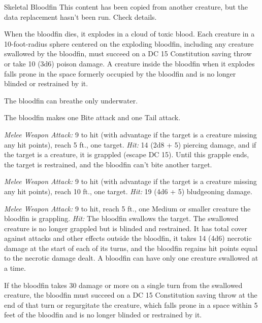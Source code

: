 \documentclass[10pt,a4paper,twoside,bg=print,twocolumn,openany,nodeprecatedcode]{dndbook}
\begin{document}
\begin{DndMonster}[float=t]{Skeletal Bloodfin}
\DndMonsterBasics[
armor-class = {16 (natural armor)},
hit-points = {\DndDice{11d10 + 33}},
speed = {5 ft., swim 50 ft.}
]
\DndMonsterAbilityScores[
 str = 20,
 dex = 14,
 con = 16,
 int = 2,
 wis = 10,
 cha = 3
]
\DndMonsterDetails[
skills = {Perception +4},
damage-immunities = {poison},
condition-immunities = {poisoned},
senses = {blindsight 100 ft. (blind beyond this radius), passive perception 14},
challenge = 9,
]
This content has been copied from another creature, but the data replacement hasn't been run. Check details.

When the bloodfin dies, it explodes in a cloud of toxic blood. Each creature in a 10-foot-radius sphere centered on the exploding bloodfin, including any creature swallowed by the bloodfin, must succeed on a DC 15 Constitution saving throw or take 10 (3d6) poison damage. A creature inside the bloodfin when it explodes falls prone in the space formerly occupied by the bloodfin and is no longer blinded or restrained by it.

The bloodfin can breathe only underwater.

The bloodfin makes one Bite attack and one Tail attack.

\textsl{Melee Weapon Attack:} 9 to hit (with advantage if the target is a creature missing any hit points), reach 5 ft., one target. \textsl{Hit:} 14 (2d8 + 5) piercing damage, and if the target is a creature, it is grappled (escape DC 15). Until this grapple ends, the target is restrained, and the bloodfin can't bite another target.

\textsl{Melee Weapon Attack:} 9 to hit (with advantage if the target is a creature missing any hit points), reach 10 ft., one target. \textsl{Hit:} 19 (4d6 + 5) bludgeoning damage.

\textsl{Melee Weapon Attack:} 9 to hit, reach 5 ft., one Medium or smaller creature the bloodfin is grappling. \textsl{Hit:} The bloodfin swallows the target. The swallowed creature is no longer grappled but is blinded and restrained. It has total cover against attacks and other effects outside the bloodfin, it takes 14 (4d6) necrotic damage at the start of each of its turns, and the bloodfin regains hit points equal to the necrotic damage dealt. A bloodfin can have only one creature swallowed at a time.

If the bloodfin takes 30 damage or more on a single turn from the swallowed creature, the bloodfin must succeed on a DC 15 Constitution saving throw at the end of that turn or regurgitate the creature, which falls prone in a space within 5 feet of the bloodfin and is no longer blinded or restrained by it.

\end{DndMonster}
\end{document}
